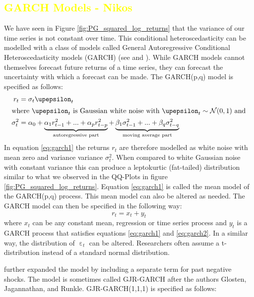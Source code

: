 \subsection{\textcolor{yellow}{GARCH Models - Nikos}} \label{sec:garch}
We have seen in Figure \ref{fig:PG_squared_log_returns} that the variance of our time series is not constant over time. This conditional heteroscedasticity can be modelled with a class of models called General Autoregressive Conditional Heteroscedasticity models (GARCH) (see \citep{engle_autoregressive_1982} and \citep{bollerslev_generalized_1986}). While GARCH models cannot themselves forecast future returns of a time series, they can forecast the uncertainty with which a forecast can be made. The GARCH(p,q) model is specified as follows:
\begin{align}
    r_{t} &= \sigma_t  \upepsilon_t \label{eq:garch1}\\
\intertext{where $\upepsilon_t$ is Gaussian white noise with  $\upepsilon_t \sim \mathcal{N}(0,1)$ and}
    \sigma^2_t &= \alpha_0 + \underbrace{\alpha_1 r^2_{t-1} + ... + \alpha_p r^2_{t-p}}_\text{autoregressive part} + \underbrace{\beta_1 \sigma^2_{t-1} + ... + \beta_q \sigma^2_{t-q}}_\text{moving average part} \label{eq:garch2}
\end{align}
In equation \ref{eq:garch1} the returns $r_t$ are therefore modelled as white noise with mean zero and variance variance $\sigma^2_t$. When compared to white Gaussian noise with constant variance this can produce a leptokurtic (fat-tailed) distribution similar to what we observed in the QQ-Plots in figure \ref{fig:PG_squared_log_returns}. Equation \ref{eq:garch1} is called the mean model of the GARCH(p,q) process. This mean model can also be altered as needed. The GARCH model can then be specified in the following way: 
\begin{equation}
    r_t = x_t + y_t
\end{equation}{}
where $x_t$ can be any constant mean, regression or time series process and $y_t$ is a GARCH process that satisfies equations \ref{eq:garch1} and \ref{eq:garch2}. In a similar way, the distribution of $\upepsilon_t$ can be altered. Researchers often assume a t-distribution instead of a standard normal distribution. 

\citet{glosten_relation_1993} further expanded the model by including a separate term for past negative shocks. The model is sometimes called GJR-GARCH after the authors Glosten, Jagannathan, and Runkle. GJR-GARCH(1,1,1) is specified as follows:

